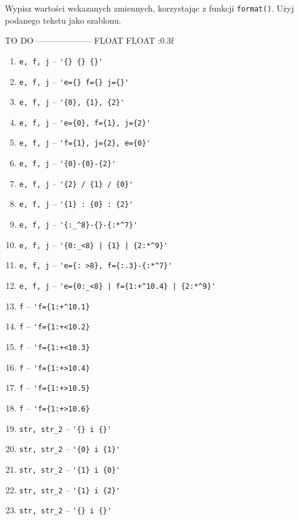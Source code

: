 \documentclass[a4paper]{article}
\begin{document}
Wypisz wartości wskazanych zmiennych, korzystając z funkcji \verb|format()|. Użyj podanego tekstu jako szablonu.

TO DO -------------------- FLOAT FLOAT {:0.3f}

\begin{enumerate}[label=\arabic*.]
    \item \verb|e, f, j| -- \verb|'{} {} {}'|
    \item \verb|e, f, j| -- \verb|'e={} f={} j={}'|

    \item \verb|e, f, j| -- \verb|'{0}, {1}, {2}'|
    \item \verb|e, f, j| -- \verb|'e={0}, f={1}, j={2}'|

    \item \verb|e, f, j| -- \verb|'f={1}, j={2}, e={0}'|
    \item \verb|e, f, j| -- \verb|'{0}-{0}-{2}'|
    \item \verb|e, f, j| -- \verb|'{2} / {1} / {0}'|
    \item \verb|e, f, j| -- \verb|'{1} : {0} : {2}'|

    \item \verb|e, f, j| -- \verb|'{:_^8}-{}-{:*^7}'|
    \item \verb|e, f, j| -- \verb-'{0:_<8} | {1} | {2:*^9}'-

    \item \verb|e, f, j| -- \verb|'e={: >8}, f={:.3}-{:*^7}'|
    \item \verb|e, f, j| -- \verb-'e={0:_<8} | f={1:+^10.4} | {2:*^9}'-

    \item \verb|f| -- \verb|'f={1:+^10.1}|
    \item \verb|f| -- \verb|'f={1:+<10.2}|
    \item \verb|f| -- \verb|'f={1:+<10.3}|
    \item \verb|f| -- \verb|'f={1:+>10.4}|
    \item \verb|f| -- \verb|'f={1:+>10.5}|
    \item \verb|f| -- \verb|'f={1:+>10.6}|

    \item \verb|str, str_2| -- \verb|'{} i {}'|
    \item \verb|str, str_2| -- \verb|'{0} i {1}'|
    \item \verb|str, str_2| -- \verb|'{1} i {0}'|
    \item \verb|str, str_2| -- \verb|'{1} i {2}'|
    \item \verb|str, str_2| -- \verb|'{} i {}'|

\end{enumerate}
\end{document}
